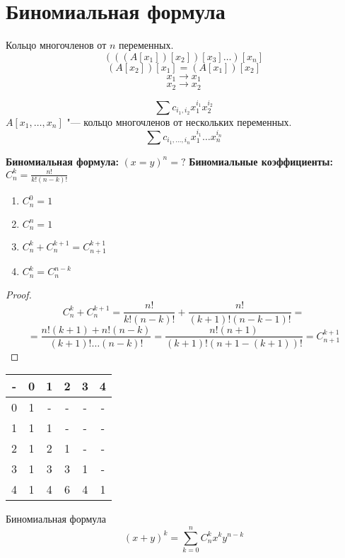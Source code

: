﻿\section{Биномиальная формула}
\begin{Def}
Кольцо многочленов от $n$ переменных.
$$(((A[x_1])[x_2])[x_3] \ldots )[x_n]$$
$$(A[x_2])[x_1] = (A[x_1])[x_2]$$
$$x_1 \to x_1$$
$$x_2 \to x_2$$

$$\sum c_{i_1, i_2}x_{1}^{i_1}x_2^{i_2}$$
$A[x_1, \ldots, x_n]$ "--- кольцо многочленов от нескольких переменных.
$$\sum c_{i_1, \ldots, i_n}x_1^{i_1}\ldots x_n^{i_n} $$
\end{Def}

{\bf Биномиальная формула:} $(x = y)^n = ?$
{\bf Биномиальные коэффициенты:} $C_n^k = \frac{n!}{k!(n - k)!}$

\begin{lemma} 
\begin{enumerate}
\item $C_n^0 = 1$
\item $C_n^n = 1$
\item $C_n^k + C_n^{k + 1} = C_{n + 1}^{k + 1}$
\item $C_n^{k} = C_{n}^{n - k}$
\end{enumerate}
\end{lemma}
\begin{proof}
$$C_n^k + C_n^{k + 1} = \frac{n!}{k!(n - k)!} + \frac{n!}{(k + 1)!(n - k - 1)!} = $$
$$= \frac{n!(k + 1) + n!(n - k)}{(k + 1)! \ldots (n - k)!} = \frac{n!(n + 1)}{(k + 1)!(n + 1 - (k + 1))!} = C_{n + 1}^{k + 1}$$
\end{proof}

\begin{Def}
\begin{tabular}{c|ccccc}
-&0&1&2&3&4\\
\hline
0&1&-&-&-&-\\
1&1&1&-&-&-\\
2&1&2&1&-&-\\
3&1&3&3&1&-\\
4&1&4&6&4&1\\
\end{tabular}
\end{Def}

\begin{theorem}{Биномиальная формула}
$$(x + y)^k = \sum_{k = 0}^nC_n^kx^ky^{n - k}$$
\end{theorem}

